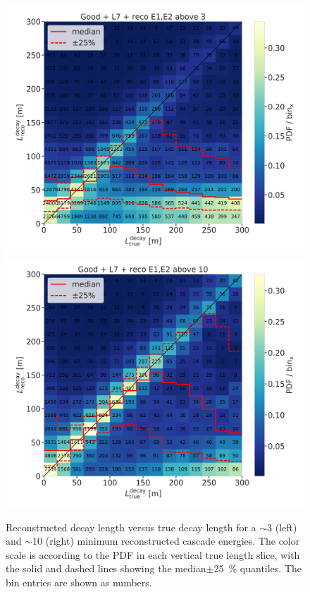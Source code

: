 \begin{figure}[h]
    \centering
    \includegraphics[width=0.49\linewidth]{figures/results/190607/resolutions/190607_millipede_level_no_NaNs_NEW_flipped_reco_decayL_vs_true_decayL_reco_above3_step_contours.png}
    \includegraphics[width=0.49\linewidth]{figures/results/190607/resolutions/190607_millipede_level_no_NaNs_NEW_flipped_reco_decayL_vs_true_decayL_reco_above10_step_contours.png}
    \caption[Preliminary 2-d reconstructed versus true decay length resolutions]{Reconstructed decay length versus true decay length for a $\sim$\SI{3}{\gev} (left) and $\sim$\SI{10}{\gev} (right) minimum reconstructed cascade energies. The color scale is according to the PDF in each vertical true length slice, with the solid and dashed lines showing the median$\pm$\SI{25}{\percent} quantiles. The bin entries are shown as numbers.}
\end{figure}





